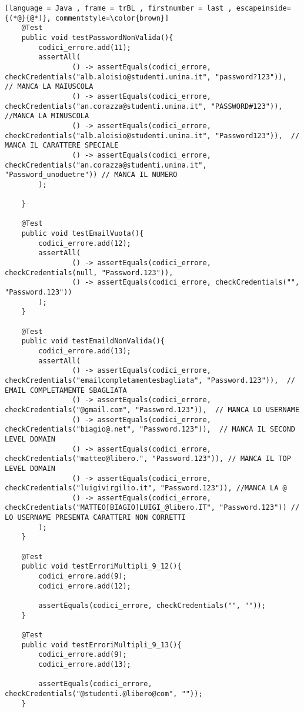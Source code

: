 \begin{lstlisting}[language = Java , frame = trBL , firstnumber = last , escapeinside={(*@}{@*)}, commentstyle=\color{brown}]
    @Test
    public void testPasswordNonValida(){
        codici_errore.add(11);
        assertAll(
                () -> assertEquals(codici_errore, checkCredentials("alb.aloisio@studenti.unina.it", "password?123")),  // MANCA LA MAIUSCOLA
                () -> assertEquals(codici_errore, checkCredentials("an.corazza@studenti.unina.it", "PASSWORD#123")),  //MANCA LA MINUSCOLA
                () -> assertEquals(codici_errore, checkCredentials("alb.aloisio@studenti.unina.it", "Password123")),  // MANCA IL CARATTERE SPECIALE
                () -> assertEquals(codici_errore, checkCredentials("an.corazza@studenti.unina.it", "Password_unoduetre")) // MANCA IL NUMERO
        );

    }

    @Test
    public void testEmailVuota(){
        codici_errore.add(12);
        assertAll(
                () -> assertEquals(codici_errore, checkCredentials(null, "Password.123")),
                () -> assertEquals(codici_errore, checkCredentials("", "Password.123"))
        );
    }

    @Test
    public void testEmaildNonValida(){
        codici_errore.add(13);
        assertAll(
                () -> assertEquals(codici_errore, checkCredentials("emailcompletamentesbagliata", "Password.123")),  // EMAIL COMPLETAMENTE SBAGLIATA
                () -> assertEquals(codici_errore, checkCredentials("@gmail.com", "Password.123")),  // MANCA LO USERNAME
                () -> assertEquals(codici_errore, checkCredentials("biagio@.net", "Password.123")),  // MANCA IL SECOND LEVEL DOMAIN
                () -> assertEquals(codici_errore, checkCredentials("matteo@libero.", "Password.123")), // MANCA IL TOP LEVEL DOMAIN
                () -> assertEquals(codici_errore, checkCredentials("luigivirgilio.it", "Password.123")), //MANCA LA @
                () -> assertEquals(codici_errore, checkCredentials("MATTEO[BIAGIO]LUIGI_@libero.IT", "Password.123")) // LO USERNAME PRESENTA CARATTERI NON CORRETTI
        );
    }

    @Test
    public void testErroriMultipli_9_12(){
        codici_errore.add(9);
        codici_errore.add(12);

        assertEquals(codici_errore, checkCredentials("", ""));
    }

    @Test
    public void testErroriMultipli_9_13(){
        codici_errore.add(9);
        codici_errore.add(13);

        assertEquals(codici_errore, checkCredentials("@studenti.@libero@com", ""));
    }


\end{lstlisting}
